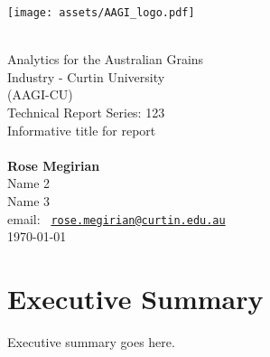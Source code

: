 \documentclass[12pt]{article}
\begin{document}
  \frontmatter

  \thispagestyle{empty}
  \vspace*{-30mm}

  \begin{center}
    \texttt{[image: assets/AAGI\_logo.pdf]}    
  \end{center}

  \vfill

  \begin{flushright}
    \HRule\\[5mm]

    \huge
    \textcolor{aagiblue}{\sbf Analytics for the Australian Grains\\
      Industry - Curtin University\\
      (AAGI-CU)\\
      Technical Report Series: 123}\\[6mm]

    {\sbf Informative title for report}\\
    \Large
    \vspace{2mm}{\sbf Report for $<$Project Number$>$}\\[5mm]

    \sf\normalsize
    \textbf{Rose Megirian}\\
    Name 2\\
    Name 3\\
    \vspace*{0.4cm}
    email:\; \texttt{%
      \href{mailto:your.email@adelaide.edu.au}%
      {rose.megirian@curtin.edu.au}}\\[8mm]
      
    \today\\
    \HRule
  \end{flushright}

  \vfill

  \noindent{}
  \vspace*{-30mm}
  
  \clearpage
  \pagestyle{plain}
  \setcounter{page}{1}
  \tableofcontents


  \clearpage
  \section*{Executive Summary}
  Executive summary goes here.
\end{document}
